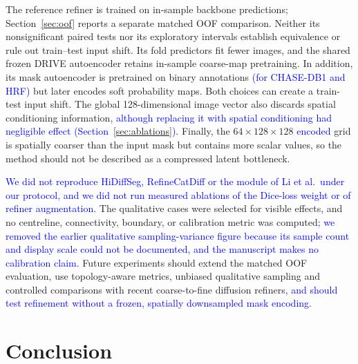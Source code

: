 \documentclass[jimaging,article,submit,pdftex,moreauthors]
  {Definitions/mdpi}
\DeclareRobustCommand{\rev}[1]{\textcolor{blue}{#1}}
\DeclareRobustCommand{\rev}[1]{#1}
\providecommand{\linelabel}[1]{}
\newcommand{\seclabel}[1]{\linelabel{rev:sec:#1}}
\newcommand{\secend}[1]{\linelabel{rev:end:#1}}
\begin{document}
The reference refiner is trained on in-sample backbone predictions; Section~\ref{sec:oof} reports a separate matched OOF comparison. Neither its nonsignificant paired tests nor its exploratory intervals establish equivalence or rule out train--test input shift. Its fold predictors fit fewer images, and the shared frozen DRIVE autoencoder retains in-sample coarse-map pretraining. In addition, its mask autoencoder is pretrained on binary annotations \rev{(for CHASE-DB1 and HRF)} but later encodes soft probability maps. Both choices can create a train-test input shift. The global 128-dimensional image vector also discards spatial conditioning information\rev{, although replacing it with spatial conditioning had negligible effect (Section~\ref{sec:ablations})}. Finally, the $64\times128\times128$ \rev{encoded} grid is spatially coarser than the input mask but contains more scalar values, so the method should not be described as a compressed latent bottleneck.

\rev{We did not reproduce HiDiffSeg, RefineCatDiff or the module of Li et al.\ under our protocol, and we did not run measured ablations of the Dice-loss weight or of refiner augmentation.} The qualitative cases were selected for visible effects, and no centreline, connectivity, boundary, or calibration metric was computed\rev{; we removed the earlier qualitative sampling-variance figure because its sample count and display scale could not be documented, and the manuscript makes no calibration claim}. Future experiments should extend the matched OOF evaluation, use topology-aware metrics, unbiased qualitative sampling and controlled comparisons with recent coarse-to-fine diffusion refiners\rev{, and should test refinement without a frozen, spatially downsampled mask encoding}.\secend{limitations}



\section{Conclusion}
\label{sec:conclusion}
\seclabel{conclusion}
\end{document}
